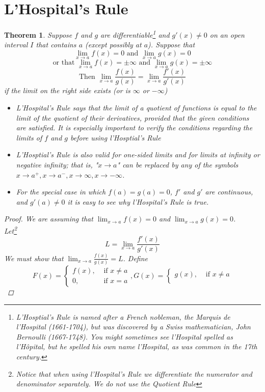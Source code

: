 \documentclass[10pt]{report}
\newtheorem{thm2}{Theorem}[section]
\begin{document}
\section{L'Hospital's Rule}
\begin{thm2}
Suppose $f$ and $g$ are differentiable\footnote{L'Hosptial's Rule is named after a French nobleman, the Marquis de l'Hospital (1661-1704), but was discovered by a Swiss mathematician, John Bernoulli (1667-1748). You might sometimes see l'Hospital spelled as l'H\^{o}pital, but he spelled his own name l'Hospital, as was common in the 17th century.} and $g'(x)\neq 0$ on an open interval $I$ that contains $a$ (except possibly at $a$). Suppose that $$\lim_{x\to a}f(x)=0 \text{  and  } \lim_{x\to a}g(x)=0$$
$$\text{or that } \lim_{x\to a}f(x)=\pm\infty \text{  and  } \lim_{x\to a}g(x)=\pm\infty$$
$$\text{Then  }\lim_{x\to a}\frac{f(x)}{g(x)}=\lim_{x\to a}\frac{f'(x)}{g'(x)}$$
if the limit on the right side exists (or is $\infty$ or $-\infty$)
\begin{itemize}
\item[1:]L'Hospital's Rule says that the limit of a quotient of functions is equal to the limit of the quotient of their derivatives, provided that the given conditions are satisfied. It is especially important to verify the conditions regarding the limits of $f$ and $g$ before using l'Hosptial's Rule
\item[2:]L'Hosptial's Rule is also valid for one-sided limits and for limits at infinity or negative infinity; that is, "$x\to a$" can be replaced by any of the symbols $x\to a^+,x\to a^-, x\to\infty, x\to -\infty$.
\item[3:]For the special case in which $f(a)=g(a)=0$, $f'$ and $g'$ are continuous, and $g'(a)\neq 0$ it is easy to see why l'Hospital's Rule is true.
\end{itemize}
\begin{proof}
We are assuming that $\lim_{x\to a}f(x)=0$ and $\lim_{x\to a}g(x)=0$.\\
Let\footnote{Notice that when using l'Hospital's Rule we differentiate the numerator and denominator separately. We do not use the Quotient Rule}
$$L=\lim_{x\to a}\frac{f'(x)}{g'(x)}$$
We must show that $\lim_{x\to a}\frac{f(x)}{g(x)}=L$. Define
$$F(x) = \begin{cases}
f(x), & \text{ if } x\neq a\\
0, & \text{ if } x=a
\end{cases}, G(x) = \begin{cases}
g(x), & \text{ if } x\neq a\\

\end{cases}$$
\end{proof}
\end{thm2}
\end{document}
